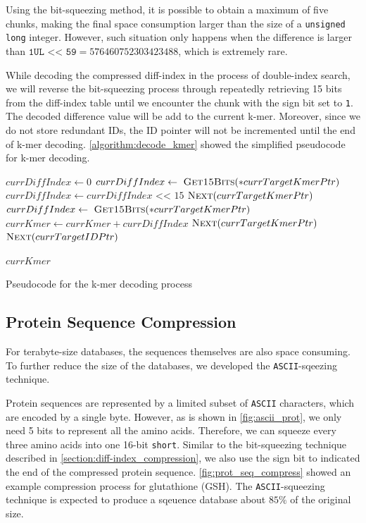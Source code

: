 Using the bit-squeezing method, it is possible to obtain a maximum of five chunks, making the final space consumption larger than the size of a \texttt{unsigned long} integer.
However, such situation only happens when the difference is larger than $\texttt{1UL << 59} = 576460752303423488$, which is extremely rare.

While decoding the compressed diff-index in the process of double-index search, we will reverse the bit-squeezing process through repeatedly retrieving 15 bits from the diff-index table until we encounter the chunk with the sign bit set to \texttt{1}.
The decoded difference value will be add to the current k-mer.
Moreover, since we do not store redundant IDs, the ID pointer will not be incremented until the end of k-mer decoding.
\cref{algorithm:decode_kmer} showed the simplified pseudocode for k-mer decoding.

\begin{algorithm}[htbp]
  \begin{algorithmic}
    \State $currDiffIndex \gets 0$
     
    \State $currDiffIndex \gets\ \textsc{Get15Bits}(*currTargetKmerPtr)$
    \State $currDiffIndex \gets currDiffIndex \texttt{ << } 15$
    \State $\textsc{Next}(currTargetKmerPtr)$
    \EndWhile
    \State $currDiffIndex \gets\ \textsc{Get15Bits}(*currTargetKmerPtr)$
    \State $currKmer \gets currKmer + currDiffIndex$
    \State $\textsc{Next}(currTargetKmerPtr)$
    \State $\textsc{Next}(currTargetIDPtr)$
    \par
    \Return $currKmer$
    \EndProcedure
    \caption{ Pseudocode for the k-mer decoding process} \label{algorithm:decode_kmer}
  \end{algorithmic}
\end{algorithm}

\subsection{Protein Sequence Compression} \label{section:protein_sequence_compression}

For terabyte-size databases, the sequences themselves are also space consuming.
To further reduce the size of the databases, we developed the \texttt{ASCII}-sqeezing technique.

Protein sequences are represented by a limited subset of \texttt{ASCII} characters, which are encoded by a single byte.
However, as is shown in \autoref{fig:ascii_prot}, we only need 5 bits to represent all the amino acids.
Therefore, we can squeeze every three amino acids into one 16-bit \texttt{short}.
Similar to the bit-squeezing technique described in \cref{section:diff-index_compression}, we also use the sign bit to indicated the end of the compressed protein sequence.
\autoref{fig:prot_seq_compress} showed an example compression process for glutathione (GSH).
The \texttt{ASCII}-squeezing technique is expected to produce a sqeuence database about $85\%$ of the original size.

